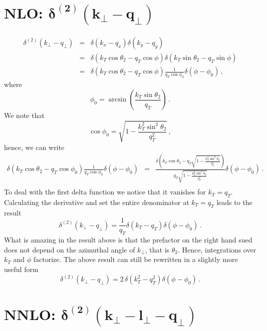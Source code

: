 \documentclass[a4paper,11pt]{report}
\numberwithin{equation}{section}
\begin{document}
\section[NLO: $\delta^{(2)}(k_\perp-q_\perp)$]{NLO: $\mathbold{\delta^{(2)}(k_\perp-q_\perp)}$}

\begin{eqnarray}
  \delta^{(2)}(k_\perp-q_\perp) 
  & = & \delta(k_x-q_x)\delta(k_y-q_y)  \\
  & = & \delta(k_T \cos\theta_2-q_T \cos\phi)
         \delta(k_T \sin\theta_2-q_T \sin\phi) \\
  & = & \delta(k_T \cos\theta_2-q_T \cos\phi)
        \frac{1}{q_T\cos\phi_0} \delta(\phi-\phi_0)\,,
\end{eqnarray}
%
where
%
\begin{equation}
  \phi_0 = \arcsin\left(\frac{k_T\sin\theta_2}{q_T}\right)\,.
\end{equation}
%
We note that
%
\begin{equation}
  \cos \phi_0  = \sqrt{1-\frac{k_T^2\sin^2\theta_2}{q_T^2}}\,,
\end{equation}
%
hence, we can write
%
\begin{eqnarray}
  \delta(k_T \cos\theta_2-q_T \cos\phi_0)
  \frac{1}{q_T\cos\phi_0} \delta(\phi-\phi_0) 
  & = &
  \frac{\delta\left(k_T \cos\theta_2-q_T
  \sqrt{1-\frac{k_T^2\sin^2\theta_2}{q_T^2}}\right)}
  {q_T\sqrt{1-\frac{k_T^2\sin^2\theta_2}{q_T^2}}} \delta(\phi-\phi_0)\,.
  \nonumber \\
\end{eqnarray}
%
To deal with the first delta function we notice that it vanishes for $k_{T} =
q_T$. Calculating the derivative and set the entire denominator at $k_{T} =
q_T$ leads to the result
%
\begin{equation}
  \delta^{(2)}(k_\perp-q_\perp)  =
  \frac{1}{q_T}\delta(k_T-q_T)\delta(\phi-\phi_0)\,.
\end{equation}
%
What is amazing in the result above is that the prefactor on the right hand sued
does not depend on the azimuthal angle of $k_\perp$, that is $\theta_2$. Hence,
integrations over $k_T$ and $\phi$ factorize.
%
The above result can still be rewritten in a slightly more useful form
%
\begin{equation}
  \delta^{(2)}(k_\perp-q_\perp)  =
  2\, \delta(k_T^2-q_T^2)\delta(\phi-\phi_0)\,.
\end{equation}

\section[NNLO: $\delta^{(2)}(k_\perp+l_\perp - q_\perp)$]{NNLO: $\mathbold{\delta^{(2)}(k_\perp-l_\perp - q_\perp)}$}
\end{document}
